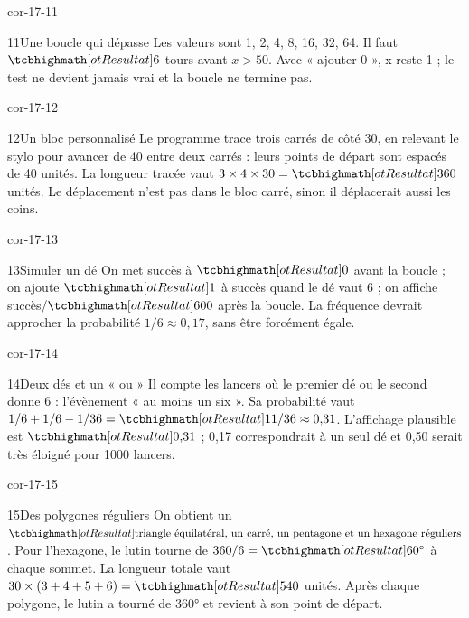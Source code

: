 \begin{blocLivre}{cor-17-11}\begin{corrige}{11}{Une boucle qui dépasse}
Les valeurs sont 1, 2, 4, 8, 16, 32, 64. Il faut $\res6$ tours avant $x>50$. Avec « ajouter 0 », x reste 1 ; le test ne devient jamais vrai et la boucle ne termine pas.
\label{fig-cor-17-11}
\end{corrige}\end{blocLivre}
\begin{blocLivre}{cor-17-12}\begin{corrige}{12}{Un bloc personnalisé}
Le programme trace trois carrés de côté 30, en relevant le stylo pour avancer de 40 entre deux carrés : leurs points de départ sont espacés de 40 unités. La longueur tracée vaut $3\times4\times30=\res{360}$ unités. Le déplacement n’est pas dans le bloc carré, sinon il déplacerait aussi les coins.
\label{fig-cor-17-12}
\end{corrige}\end{blocLivre}
\begin{blocLivre}{cor-17-13}\begin{corrige}{13}{Simuler un dé}
On met succès à $\res0$ avant la boucle ; on ajoute $\res1$ à succès quand le dé vaut 6 ; on affiche succès/$\res{600}$ après la boucle. La fréquence devrait approcher la probabilité $1/6\approx0{,}17$, sans être forcément égale.
\label{fig-cor-17-13}
\end{corrige}\end{blocLivre}
\begin{blocLivre}{cor-17-14}\begin{corrige}{14}{Deux dés et un « ou »}
Il compte les lancers où le premier dé ou le second donne 6 : l’évènement « au moins un six ». Sa probabilité vaut $1/6+1/6-1/36=\res{11/36}\approx0{,}31$. L’affichage plausible est $\res{0{,}31}$ ; 0,17 correspondrait à un seul dé et 0,50 serait très éloigné pour 1000 lancers.
\label{fig-cor-17-14}
\end{corrige}\end{blocLivre}
\begin{blocLivre}{cor-17-15}\begin{corrige}{15}{Des polygones réguliers}
On obtient un $\res{\text{triangle équilatéral, un carré, un pentagone et un hexagone réguliers}}$. Pour l’hexagone, le lutin tourne de $360/6=\res{60^\circ}$ à chaque sommet. La longueur totale vaut $30\times(3+4+5+6)=\res{540}$ unités. Après chaque polygone, le lutin a tourné de 360° et revient à son point de départ.
\label{fig-cor-17-15}
\end{corrige}\end{blocLivre}
